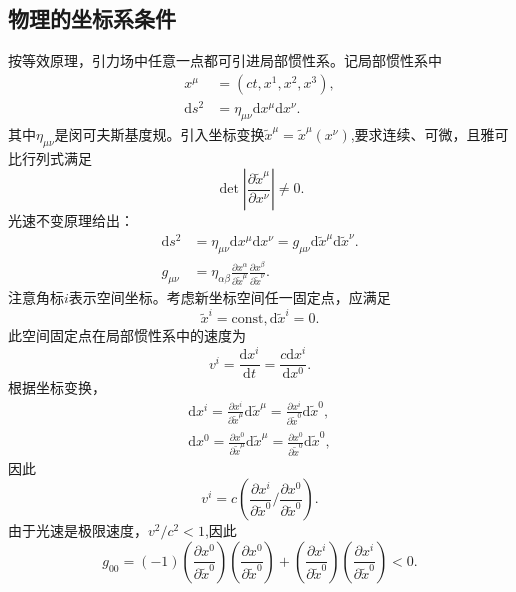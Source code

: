 \documentclass[11pt, a4paper, oneside, onecolumn]{ctexart}
\numberwithin{equation}{subsection}
\begin{document}
\subsection{物理的坐标系条件}
按等效原理，引力场中任意一点都可引进局部惯性系。记局部惯性系中
\begin{align}
x^{\mu}&=\left(ct,x^{1},x^{2},x^{3}\right),\\
\mathrm{d}s^{2}&=\eta_{\mu\nu}\mathrm{d}x^{\mu}\mathrm{d}x^{\nu}.
\end{align}
其中$\eta_{\mu\nu}$是闵可夫斯基度规。引入坐标变换$\widetilde{x}^{\mu}=\widetilde{x}^{\mu}\left(x^{\nu}\right)$,要求连续、可微，且雅可比行列式满足
\begin{equation}
\det\left\vert{}\frac{\partial{}\widetilde{x}^{\mu}}{\partial{}x^{\nu}}\right\vert{}\ne0.
\end{equation}
光速不变原理给出：
\begin{align}
\mathrm{d}s^{2}&=\eta_{\mu\nu}\mathrm{d}x^{\mu}\mathrm{d}x^{\nu}=g_{\mu\nu}\mathrm{d}\widetilde{x}^{\mu}\mathrm{d}\widetilde{x}^{\nu}.\\
g_{\mu\nu}&=\eta_{\alpha\beta}\frac{\partial{}x^{\alpha}}{\partial{}\widetilde{x}^{\mu}}\frac{\partial{}x^{\beta}}{\partial{}\widetilde{x}^{\nu}}.
\end{align}
注意角标${i}$表示空间坐标。考虑新坐标空间任一固定点，应满足
\begin{equation}
\widetilde{x}^{i}=\text{const},\mathrm{d}\widetilde{x}^{i}=0.
\end{equation}
此空间固定点在局部惯性系中的速度为
\begin{equation}
v^{i}=\frac{\mathrm{d}x^{i}}{\mathrm{d}t}=\frac{c\mathrm{d}x^{i}}{\mathrm{d}x^{0}}.
\end{equation}
根据坐标变换，
\begin{align}
\mathrm{d}x^{i}=\frac{\partial{}x^{i}}{\partial{}\widetilde{x}^{\mu}}\mathrm{d}\widetilde{x}^{\mu}=\frac{\partial{}x^{i}}{\partial{}\widetilde{x}^{0}}\mathrm{d}\widetilde{x}^{0},\\
\mathrm{d}x^{0}=\frac{\partial{}x^{0}}{\partial{}\widetilde{x}^{\mu}}\mathrm{d}\widetilde{x}^{\mu}=\frac{\partial{}x^{0}}{\partial{}\widetilde{x}^{0}}\mathrm{d}\widetilde{x}^{0},
\end{align}
因此
\begin{equation}
v^{i}=c\left(\frac{\partial{}x^{i}}{\partial{}\widetilde{x}^{0}}/\frac{\partial{}x^{0}}{\partial{}\widetilde{x}^{0}}\right).
\end{equation}
由于光速是极限速度，$v^{2}/c^{2}<1$,因此
\begin{equation}
g_{00}=\left(-1\right)\left(\frac{\partial{}x^{0}}{\partial{}\widetilde{x}^{0}}\right)\left(\frac{\partial{}x^{0}}{\partial{}\widetilde{x}^{0}}\right)+\left(\frac{\partial{}x^{i}}{\partial{}\widetilde{x}^{0}}\right)\left(\frac{\partial{}x^{i}}{\partial{}\widetilde{x}^{0}}\right)<0.\label{2.2.11}
\end{equation}
\end{document}
